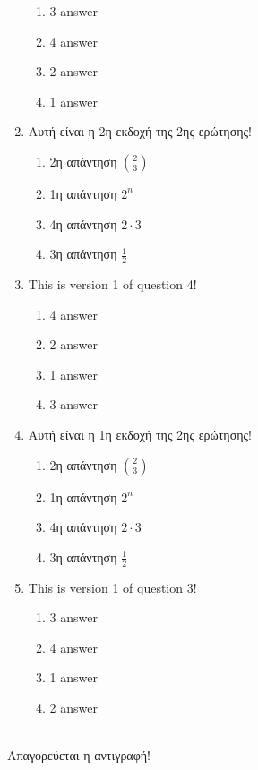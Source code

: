 \documentclass[a4paper, 11pt]{article}
\begin{document}
\begin{enumerate}
\begin{enumerate}[(1)]
    \item 3 answer
    \item 4 answer
    \item 2 answer
    \item 1 answer
\end{enumerate}
\item Αυτή είναι η 2η εκδοχή της 2ης ερώτησης!
\begin{enumerate}[(1)]
    \item 2η απάντηση $\binom{2}{3}$
    \item 1η απάντηση $2^n$
    \item 4η απάντηση $2\cdot 3$
    \item 3η απάντηση $\frac{1}{2}$
\end{enumerate}
\item This is version 1 of question 4!
\begin{enumerate}[(1)]
    \item 4 answer
    \item 2 answer
    \item 1 answer
    \item 3 answer
\end{enumerate}
\item Αυτή είναι η 1η εκδοχή της 2ης ερώτησης!
\begin{enumerate}[(1)]
    \item 2η απάντηση $\binom{2}{3}$
    \item 1η απάντηση $2^n$
    \item 4η απάντηση $2\cdot 3$
    \item 3η απάντηση $\frac{1}{2}$
\end{enumerate}
\item This is version 1 of question 3!
\begin{enumerate}[(1)]
    \item 3 answer
    \item 4 answer
    \item 1 answer
    \item 2 answer
\end{enumerate}
\end{enumerate}
\hrulefill \\ 

Απαγορεύεται η αντιγραφή! 

\newpage 
\end{document}
